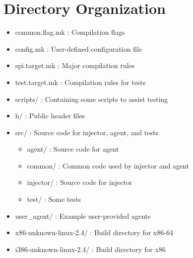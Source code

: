 \section{Directory Organization}

\begin{itemize}
\item common.flag.mk : Compilation flags
\item config.mk : User-defined configuration file
\item spi.target.mk : Major compilation rules
\item test.target.mk : Compilation rules for tests
\item scripts/ : Containing some scripts to assist testing
\item h/ : Public header files
\item src/ : Source code for injector, agent, and tests
\begin{itemize}
\item agent/ : Source code for agent
\item common/ : Common code used by injector and agent
\item injector/ : Source code for injector
\item test/ : Some tests
\end{itemize}
\item user\_agent/ : Example user-provided agents
\item x86-unknown-linux-2.4/ : Build directory for x86-64
\item i386-unknown-linux-2.4/ : Build directory for x86
\end{itemize}
